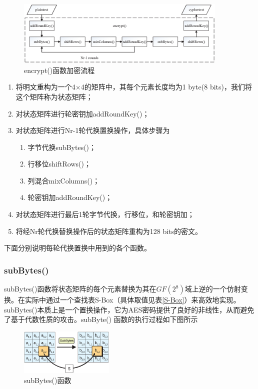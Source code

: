 \begin{figure}[h]
    \centering
    \includegraphics[width=0.9\textwidth,trim=0 30 0 20,clip]{./pic/encrypt.eps}
    \caption{encrypt()函数加密流程}
\end{figure}

\begin{enumerate}
    \item 将明文重构为一个4$\times$4的矩阵中，其每个元素长度均为1 byte(8 bits)，我们将这个矩阵称为状态矩阵；
    \item 对状态矩阵进行轮密钥加addRoundKey()；
    \item 对状态矩阵进行Nr-1轮代换置换操作，具体步骤为
    \begin{enumerate}
        \item 字节代换subBytes()；
        \item 行移位shiftRows()；
        \item 列混合mixColumns()；
        \item 轮密钥加addRoundKey()；
    \end{enumerate}
    \item 对状态矩阵进行最后1轮字节代换，行移位，和轮密钥加；
    \item 将经Nr轮代换替换操作后的状态矩阵重构为128 bits的密文。
\end{enumerate}

下面分别说明每轮代换置换中用到的各个函数。

\subsubsection{subBytes()}
\label{subBytes}

subBytes()函数将状态矩阵的每个元素替换为其在$GF(2^8)$域上逆的一个仿射变换。在实际中通过一个查找表S-Box（具体取值见表\ref{S-Box}）来高效地实现。subBytes()本质上是一个置换操作，它为AES密码提供了良好的非线性，从而避免了基于代数性质的攻击。subByte() 函数的执行过程如下图所示

\begin{figure}[h]
    \centering
    \includegraphics[width=0.4\textwidth,trim=0 30 0 10,clip]{./pic/subBytes.eps}
    \caption{subBytes()函数}
\end{figure}

